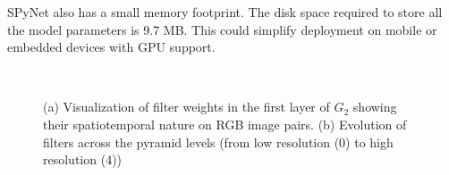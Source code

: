 \documentclass[10pt,twocolumn,letterpaper]{article}
\begin{document}
SPyNet also has a small memory footprint. 
The disk space required to store all the model parameters is 9.7
MB. 
This could simplify deployment on mobile or embedded devices with GPU support.

\begin{figure}[t]
\begin{center}
~
\end{center}     %
\vspace{-0.1in}
\caption{(a) Visualization of filter weights in the first layer of $G_2$ showing their spatiotemporal nature on RGB image pairs. (b) Evolution of filters across the pyramid levels (from low resolution (0) to high resolution (4))}
\end{figure}
\end{document}
